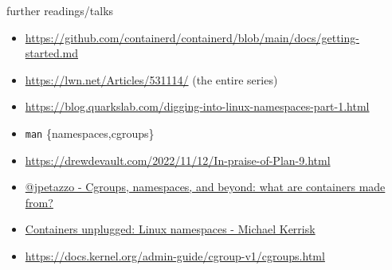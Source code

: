 \documentclass[
  english,          
  aspectratio=169,    %
]{tumbeamer}
\begin{document}
\begin{frame}{further readings/talks}
\begin{itemize}
    \item \href{https://github.com/containerd/containerd/blob/main/docs/getting-started.md}{https://github.com/containerd/containerd/blob/main/docs/getting-started.md}
    \item \href{https://lwn.net/Articles/531114/}{https://lwn.net/Articles/531114/} (the entire series)
    \item \href{https://blog.quarkslab.com/digging-into-linux-namespaces-part-1.html}{https://blog.quarkslab.com/digging-into-linux-namespaces-part-1.html}
    \item \texttt{man} \{namespaces,cgroups\}
    \item \href{https://drewdevault.com/2022/11/12/In-praise-of-Plan-9.html}{https://drewdevault.com/2022/11/12/In-praise-of-Plan-9.html}
    \item \href{https://www.youtube.com/watch?v=sK5i-N34im8}{@jpetazzo - Cgroups, namespaces, and beyond: what are containers made from?}
    \item \href{https://www.youtube.com/watch?v=0kJPa-1FuoI}{Containers unplugged: Linux namespaces - Michael Kerrisk}
    \item \href{https://docs.kernel.org/admin-guide/cgroup-v1/cgroups.html}{https://docs.kernel.org/admin-guide/cgroup-v1/cgroups.html}
\end{itemize}
\end{frame}
\end{document}
